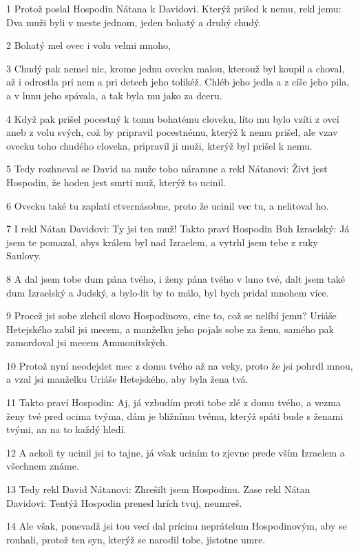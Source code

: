 \par 1 Protož poslal Hospodin Nátana k Davidovi. Kterýž prišed k nemu, rekl jemu: Dva muži byli v meste jednom, jeden bohatý a druhý chudý.
\par 2 Bohatý mel ovec i volu velmi mnoho,
\par 3 Chudý pak nemel nic, krome jednu ovecku malou, kterouž byl koupil a choval, až i odrostla pri nem a pri detech jeho tolikéž. Chléb jeho jedla a z cíše jeho pila, a v lunu jeho spávala, a tak byla mu jako za dceru.
\par 4 Když pak prišel pocestný k tomu bohatému cloveku, líto mu bylo vzíti z ovcí aneb z volu svých, což by pripravil pocestnému, kterýž k nemu prišel, ale vzav ovecku toho chudého cloveka, pripravil ji muži, kterýž byl prišel k nemu.
\par 5 Tedy rozhneval se David na muže toho náramne a rekl Nátanovi: Živt jest Hospodin, že hoden jest smrti muž, kterýž to ucinil.
\par 6 Ovecku také tu zaplatí ctvernásobne, proto že ucinil vec tu, a nelitoval ho.
\par 7 I rekl Nátan Davidovi: Ty jsi ten muž! Takto praví Hospodin Buh Izraelský: Já jsem te pomazal, abys králem byl nad Izraelem, a vytrhl jsem tebe z ruky Saulovy.
\par 8 A dal jsem tobe dum pána tvého, i ženy pána tvého v luno tvé, dalt jsem také dum Izraelský a Judský, a bylo-lit by to málo, byl bych pridal mnohem více.
\par 9 Procež jsi sobe zlehcil slovo Hospodinovo, cine to, což se nelíbí jemu? Uriáše Hetejského zabil jsi mecem, a manželku jeho pojals sobe za ženu, samého pak zamordoval jsi mecem Ammonitských.
\par 10 Protož nyní neodejdet mec z domu tvého až na veky, proto že jsi pohrdl mnou, a vzal jsi manželku Uriáše Hetejského, aby byla žena tvá.
\par 11 Takto praví Hospodin: Aj, já vzbudím proti tobe zlé z domu tvého, a vezma ženy tvé pred ocima tvýma, dám je bližnímu tvému, kterýž spáti bude s ženami tvými, an na to každý hledí.
\par 12 A ackoli ty ucinil jsi to tajne, já však uciním to zjevne prede vším Izraelem a všechnem známe.
\par 13 Tedy rekl David Nátanovi: Zhrešilt jsem Hospodinu. Zase rekl Nátan Davidovi: Tentýž Hospodin prenesl hrích tvuj, neumreš.
\par 14 Ale však, ponevadž jsi tou vecí dal prícinu neprátelum Hospodinovým, aby se rouhali, protož ten syn, kterýž se narodil tobe, jistotne umre.
